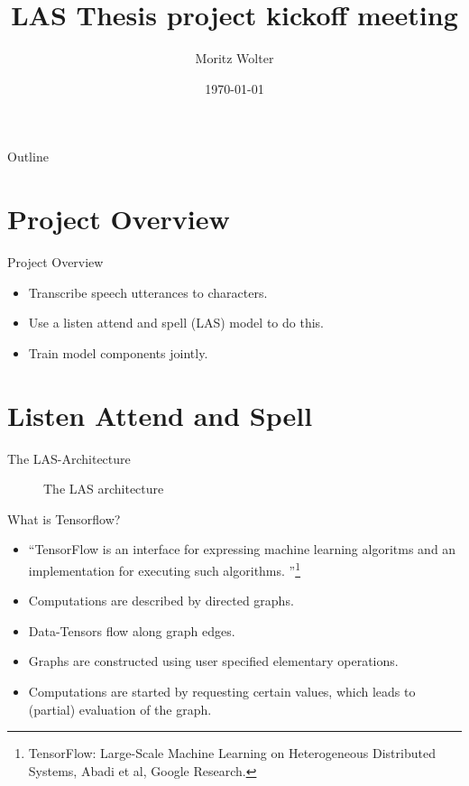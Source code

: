 \documentclass{beamer}
\title{LAS Thesis project kickoff meeting}
\author{Moritz Wolter}
\date{\today}
\begin{document}
\begin{frame}
  \titlepage
\end{frame}


\begin{frame}{Outline}
  \tableofcontents
\end{frame}

\section{Project Overview}
\begin{frame}{Project Overview}
	\begin{itemize}
		\item Transcribe speech utterances to characters. 
		\item Use a listen attend and spell (LAS) model to do this.
		\item Train model components jointly.
	\end{itemize}
\end{frame}

\section{Listen Attend and Spell}

\begin{frame}{The LAS-Architecture}
\begin{figure}
\caption{The LAS architecture}
\label{fig:las}
\end{figure}
\end{frame}


\begin{frame}{What is Tensorflow?}
	\begin{itemize}
		\item \textquotedblleft TensorFlow is an interface for expressing machine learning algoritms and an implementation for executing such algorithms. \textquotedblright \footnote{TensorFlow:
			  Large-Scale Machine Learning on Heterogeneous Distributed Systems, Abadi et al, Google Research.}
		\item Computations are described by directed graphs. 
		\item Data-Tensors flow along graph edges.
		\item Graphs are constructed using user specified elementary
			  operations.
		\item Computations are started by requesting certain values, which leads
			  to (partial) evaluation of the graph.
	\end{itemize}
\end{frame}
\end{document}

